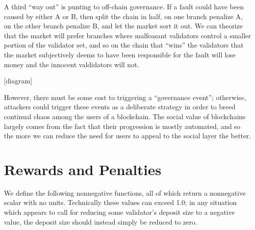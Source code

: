 \documentclass[12pt, final]{article}
\begin{document}
A third ``way out'' is punting to off-chain governance. If a fault could have been caused by either A or B, then split the chain in half, on one branch penalize A, on the other branch penalize B, and let the market sort it out. We can theorize that the market will prefer branches where malfeasant validators control a smaller portion of the validator set, and so on the chain that ``wins'' the validators that the market subjectively deems to have been responsible for the fault will lose money and the innocent valdidators will not.

[diagram]

However, there must be some cost to triggering a ``governance event''; otherwise, attackers could trigger these events as a deliberate strategy in order to breed continual chaos among the users of a blockchain. The social value of blockchains largely comes from the fact that their progression is mostly automated, and so the more we can reduce the need for users to appeal to the social layer the better.

\section{Rewards and Penalties}

We define the following nonnegative functions, all of which return a nonnegative scalar with no units.  Technically these values can exceed 1.0; in any situation which appears to call for reducing some validator's deposit size to a negative value, the deposit size should instead simply be reduced to zero.
\end{document}
